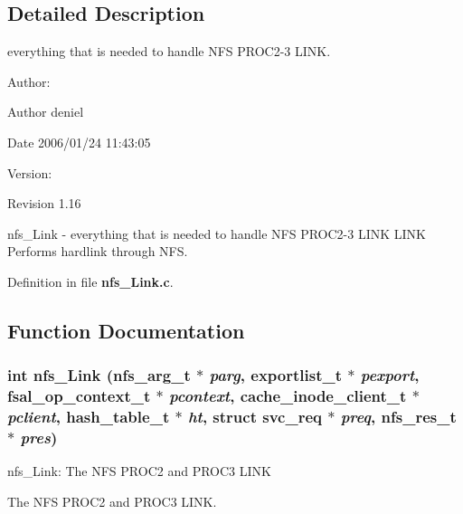 \subsection{Detailed Description}
everything that is needed to handle NFS PROC2-3 LINK. 

\begin{Desc}
\item[Author:]\end{Desc}
\begin{Desc}
\item[Author]deniel \end{Desc}
\begin{Desc}
\item[Date]2006/01/24 11:43:05 \end{Desc}
\begin{Desc}
\item[Version:]\end{Desc}
\begin{Desc}
\item[Revision]1.16 \end{Desc}
nfs\_\-Link - everything that is needed to handle NFS PROC2-3 LINK LINK Performs hardlink through NFS. 

Definition in file {\bf nfs\_\-Link.c}.

\subsection{Function Documentation}
\subsubsection[{nfs\_\-Link}]{\setlength{\rightskip}{0pt plus 5cm}int nfs\_\-Link (nfs\_\-arg\_\-t $\ast$ {\em parg}, \/  exportlist\_\-t $\ast$ {\em pexport}, \/  fsal\_\-op\_\-context\_\-t $\ast$ {\em pcontext}, \/  cache\_\-inode\_\-client\_\-t $\ast$ {\em pclient}, \/  hash\_\-table\_\-t $\ast$ {\em ht}, \/  struct svc\_\-req $\ast$ {\em preq}, \/  nfs\_\-res\_\-t $\ast$ {\em pres})}\label{nfs__Link_8c_593b91c7f054c466a5de4b6a6750b262}


nfs\_\-Link: The NFS PROC2 and PROC3 LINK

The NFS PROC2 and PROC3 LINK.

